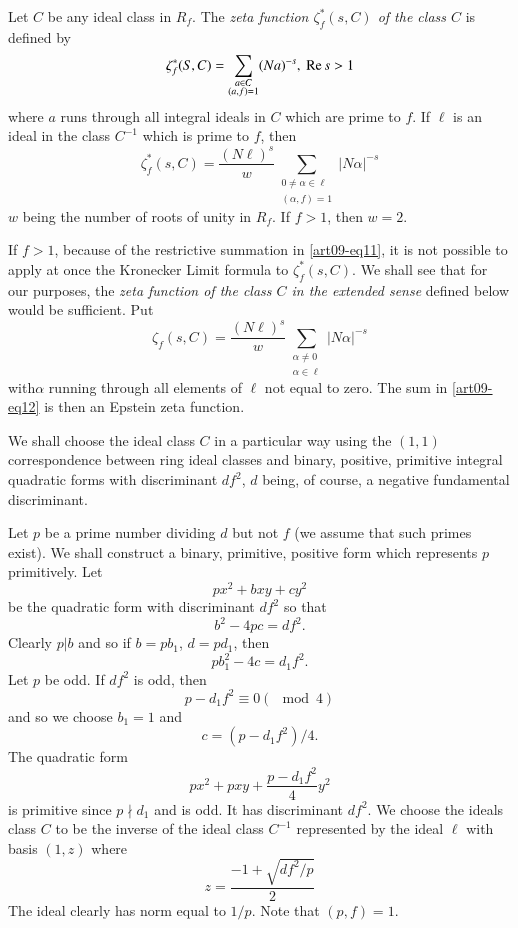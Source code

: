 Let $C$ be any ideal class in $R_{f}$. The {\em zeta function $\zeta^{*}_{f}(s,C)$ of the class $C$} is defined by
\begin{equation}
\zeta^{*}_{f}(S,C)=\sum\limits_{\substack{a\in C\\ (a,f)=1}}(Na)^{-s}, \ \operatorname{Re} s>1\label{art09-eq10}
\end{equation}
where $a$ runs through all integral ideals in $C$ which are prime to $f$. If $\ell$ is an ideal in the class $C^{-1}$ which is prime to $f$, then
\begin{equation}
\zeta^{*}_{f}(s,C)=\dfrac{(N\ell)^{s}}{w}\sum\limits_{\substack{0\neq \alpha\in \ell\\ (\alpha,f)=1}}|N\alpha|^{-s}\label{art09-eq11}
\end{equation}
$w$ being the number of roots of unity in $R_{f}$. If $f>1$, then $w=2$.

If $f>1$, because of the restrictive summation in \eqref{art09-eq11}, it is not possible to apply at once the Kronecker Limit formula to $\zeta^{*}_{f}(s,C)$. We shall see that for our purposes, the {\em zeta function of the class $C$ in the extended sense} defined below would be sufficient. Put
\begin{equation}
\zeta_{f}(s,C)=\frac{(N\ell)^{s}}{w}\sum\limits_{\substack{\alpha\neq 0\\ \alpha\in \ell}}|N\alpha|^{-s}\label{art09-eq12}
\end{equation}
with\pageoriginale $\alpha$ running through all elements of $\ell$ not equal to zero. The sum in \eqref{art09-eq12} is then an Epstein zeta function.

We shall choose the ideal class $C$ in a particular way using the $(1,1)$ correspondence between ring ideal classes and binary, positive, primitive integral quadratic forms with discriminant $df^{2}$, $d$ being, of course, a negative fundamental discriminant.

Let $p$ be a prime number dividing $d$ but not $f$ (we assume that such primes exist). We shall construct a binary, primitive, positive form which represents $p$ primitively. Let
$$
px^{2}+bxy+cy^{2}
$$
be the quadratic form with discriminant $df^{2}$ so that
\begin{equation}
b^{2}-4pc=df^{2}.\label{art09-eq13}
\end{equation}
Clearly $p|b$ and so if $b=pb_{1}$, $d=pd_{1}$, then
$$
pb^{2}_{1}-4c=d_{1}f^{2}.
$$
Let $p$ be odd. If $df^{2}$ is odd, then
$$
p-d_{1}f^{2}\equiv 0(\mod 4)
$$
and so we choose $b_{1}=1$ and 
$$
c=(p-d_{1}f^{2})/4.
$$
The quadratic form
$$
px^{2}+pxy+\frac{p-d_{1}f^{2}}{4}y^{2}
$$
is primitive since $p\nmid d_{1}$ and is odd. It has discriminant $df^{2}$. We choose the ideals class $C$ to be the inverse of the ideal class $C^{-1}$ represented by the ideal $\ell$ with basis $(1,z)$ where
\begin{equation}
z=\dfrac{-1+\sqrt{df^{2}/p}}{2}\label{art09-eq14}
\end{equation}
The ideal clearly has norm equal to $1/p$. Note that $(p,f)=1$.

